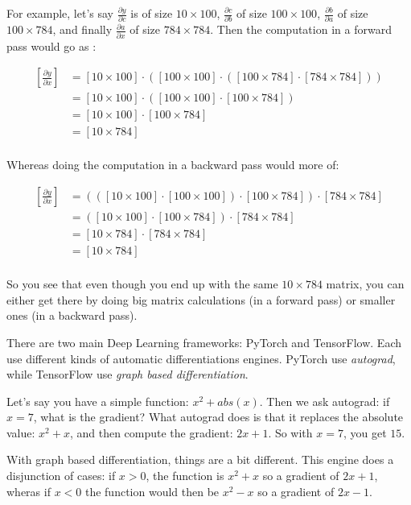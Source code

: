 \documentclass{article}
\theoremstyle{problemstyle}
\begin{document}
For example, let's say $  \frac{\partial y}{\partial c} $ is of size $ 10 \times 100$, $ \frac{\partial c}{\partial b} $ of size $ 100 \times 100$, $  \frac{\partial b}{\partial a} $ of size $ 100 \times 784$, and finally $ \frac{\partial a}{\partial x} $ of size $ 784 \times 784 $. 
Then the computation in a forward pass would go as :

\begin{align*}
  \left[ \frac{\partial y}{\partial x} \right] &= [10 \times 100] \cdot \left( [100 \times 100] \cdot \left( [100 \times 784] \cdot [784 \times 784] \right) \right) \\ 
  &= [10 \times 100] \cdot \left( [100 \times 100] \cdot [100 \times  784] \right) \\ 
  &= [10 \times 100] \cdot [100 \times  784] \\ 
  &= [10 \times 784] \\ 
\end{align*}

Whereas doing the computation in a backward pass would more of:

\begin{align*}
  \left[ \frac{\partial y}{\partial x} \right] &= \left( \left(  [10 \times 100] \cdot [100 \times 100] \right) \cdot [100 \times 784] \right) \cdot [784 \times 784] \\ 
  &= \left(  [10 \times 100] \cdot [100 \times 784] \right) \cdot [784 \times 784] \\ 
  &= [10 \times 784] \cdot [784 \times 784] \\ 
  &= [10 \times 784] \\ 
\end{align*}

So you see that even though you end up with the same $10 \times 784$ matrix, you can either get there by doing big matrix calculations (in a forward pass) or smaller ones (in a backward pass).

There are two main Deep Learning frameworks: PyTorch and TensorFlow. Each use different kinds of automatic differentiations engines. PyTorch use \emph{autograd}, while TensorFlow use \emph{graph based differentiation}.


Let's say you have a simple function: $x^2 + abs(x)$. Then we ask autograd: if $x=7$, what is the gradient? What autograd does is that it replaces the absolute value: $x^2 + x$, and then compute the gradient: $2x + 1$. So with $x=7$, you get $15$.

With graph based differentiation, things are a bit different. This engine does a disjunction of cases: if $x > 0$, the function is $x^2 + x$ so a gradient of $2x + 1$, wheras if $x< 0 $ the function would then be $x^2 - x$ so a gradient of $2x - 1$.
\end{document}
